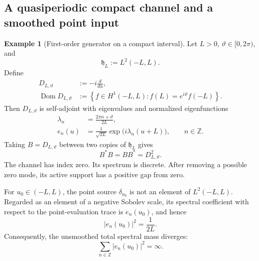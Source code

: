 \documentclass[11pt,reqno]{scrartcl}
\newcommand{\ZZ}{\mathbb Z}
\DeclareMathOperator{\Dom}{Dom}
\theoremstyle{plain}
\theoremstyle{definition}
\newtheorem{example}[example]{Example}
\theoremstyle{remark}
\begin{document}
\subsection{A quasiperiodic compact channel and a smoothed point input}

\begin{example}[First-order generator on a compact interval]
\label{ex:quasiperiodic-channel}
Let \(L>0\), \(\vartheta\in[0,2\pi)\), and
\begin{equation}
  \mathfrak h_L:=L^2(-L,L).
\end{equation}
Define
\begin{align}
  D_{L,\vartheta}
  &:=-i\frac{d}{du},
  \label{eq:quasiperiodic-generator}\\
  \Dom D_{L,\vartheta}
  &:=\left\{f\in H^1(-L,L):
  f(L)=e^{i\vartheta}f(-L)\right\}.
  \label{eq:quasiperiodic-domain}
\end{align}
Then \(D_{L,\vartheta}\) is self-adjoint with eigenvalues and normalized
eigenfunctions
\begin{align}
  \lambda_n
  &=\frac{2\pi n+\vartheta}{2L},
  \label{eq:quasiperiodic-eigenvalues}\\
  e_n(u)
  &=\frac{1}{\sqrt{2L}}
  \exp\bigl(i\lambda_n(u+L)\bigr),
  \qquad n\in\ZZ.
  \label{eq:quasiperiodic-eigenfunctions}
\end{align}
Taking \(B=D_{L,\vartheta}\) between two copies of \(\mathfrak h_L\) gives
\begin{equation}
  B^*B=BB^*=D_{L,\vartheta}^2.
  \label{eq:quasiperiodic-partners}
\end{equation}
The channel has index zero.  Its spectrum is discrete.  After removing a
possible zero mode, its active support has a positive gap from zero.
\end{example}

For \(u_0\in(-L,L)\), the point source \(\delta_{u_0}\) is not an element of
\(L^2(-L,L)\).  Regarded as an element of a negative Sobolev scale, its spectral coefficient
with respect to the point-evaluation trace is \(e_n(u_0)\), and hence
\begin{equation}
  |e_n(u_0)|^2=\frac{1}{2L}.
  \label{eq:uniform-point-weights}
\end{equation}
Consequently, the unsmoothed total spectral mass diverges:
\begin{equation}
  \sum_{n\in\ZZ}|e_n(u_0)|^2=\infty.
  \label{eq:unsmoothed-point-mass}
\end{equation}
\end{document}
